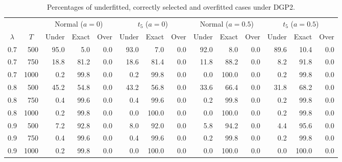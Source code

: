 \begin{table}[htbp]
\centering
\caption{\label{tab_BIC} Percentages of underfitted, correctly selected and overfitted cases under DGP2.}
\begin{adjustbox}{width=\textwidth}
\begin{tabular}{rrrrrrrrrrrrrr}
\toprule
& & \multicolumn{3}{c}{Normal ($a=0$)} & \multicolumn{3}{c}{$t_5$ ($a=0$)} & \multicolumn{3}{c}{Normal ($a=0.5$)} & \multicolumn{3}{c}{$t_5$ ($a=0.5$)} \\
\cmidrule(lr){3-5} \cmidrule(lr){6-8} \cmidrule(lr){9-11} \cmidrule(lr){12-14}
\multicolumn{1}{c}{$\lambda$}& \multicolumn{1}{c}{$T$} & Under & Exact & Over & Under & Exact & Over & Under & Exact & Over & Under & Exact & Over \\
\midrule
        0.7 & 500 & 95.0 & 5.0 & 0.0 & 93.0 & 7.0 & 0.0 & 92.0 & 8.0 & 0.0 & 89.6 & 10.4 & 0.0 \\
        0.7 & 750 & 18.8 & 81.2 & 0.0 & 18.6 & 81.4 & 0.0 & 11.8 & 88.2 & 0.0 & 8.2 & 91.8 & 0.0 \\
        0.7 & 1000 & 0.2 & 99.8 & 0.0 & 0.2 & 99.8 & 0.0 & 0.0 & 100.0 & 0.0 & 0.2 & 99.8 & 0.0 \\
        0.8 & 500 & 45.2 & 54.8 & 0.0 & 43.2 & 56.8 & 0.0 & 33.6 & 66.4 & 0.0 & 31.8 & 68.2 & 0.0 \\
        0.8 & 750 & 0.4 & 99.6 & 0.0 & 0.4 & 99.6 & 0.0 & 0.2 & 99.8 & 0.0 & 0.2 & 99.8 & 0.0 \\
        0.8 & 1000 & 0.2 & 99.8 & 0.0 & 0.0 & 100.0 & 0.0 & 0.0 & 100.0 & 0.0 & 0.2 & 99.8 & 0.0 \\
        0.9 & 500 & 7.2 & 92.8 & 0.0 & 8.0 & 92.0 & 0.0 & 5.8 & 94.2 & 0.0 & 4.4 & 95.6 & 0.0 \\
        0.9 & 750 & 0.4 & 99.6 & 0.0 & 0.4 & 99.6 & 0.0 & 0.2 & 99.8 & 0.0 & 0.2 & 99.8 & 0.0 \\
        0.9 & 1000 & 0.2 & 99.8 & 0.0 & 0.0 & 100.0 & 0.0 & 0.0 & 100.0 & 0.0 & 0.0 & 100.0 & 0.0 \\
\bottomrule
\end{tabular}
\end{adjustbox}
\end{table}
